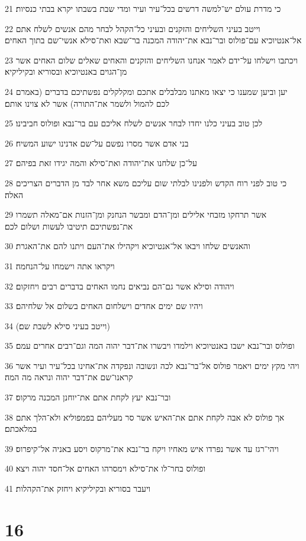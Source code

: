 \par 21 כי מדרת עולם יש־למשה דרשים בכל־עיר ועיר ומדי שבת בשבתו יקרא בבתי כנסיות׃
\par 22 וייטב בעיני השליחים והזקנים ובעיני כל־הקהל לבחר מהם אנשים לשלח אתם אל־אנטיוכיא עם־פולוס ובר־נבא את־יהודה המכנה בר־שבא ואת־סילא אנשי־שם בתוך האחים׃
\par 23 ויכתבו וישלחו על־ידם לאמר אנחנו השליחים והזקנים והאחים שאלים שלום האחים אשר מן־הגוים באנטיוכיא ובסוריא ובקיליקיא׃
\par 24 יען וביען שמענו כי יצאו מאתנו מבלבלים אתכם ומקלקלים נפשתיכם בדברים (באמרם לכם להמול ולשמר את־התורה) אשר לא צוינו אותם׃
\par 25 לכן טוב בעיני כלנו יחדו לבחר אנשים לשלח אליכם עם בר־נבא ופולוס חביבינו׃
\par 26 בני אדם אשר מסרו נפשם על־שם אדנינו ישוע המשיח׃
\par 27 על־כן שלחנו את־יהודה ואת־סילא והמה יגידו זאת בפיהם׃
\par 28 כי טוב לפני רוח הקדש ולפנינו לבלתי שום עליכם משא אחר לבד מן הדברים הצריכים האלה׃
\par 29 אשר תרחקו מזבחי אלילים ומן־הדם ומבשר הנחנק ומן־הזנות אם־מאלה תשמרו את־נפשתיכם תיטיבו לעשות ושלום לכם׃
\par 30 והאנשים שלחו ויבאו אל־אנטיוכיא ויקהילו את־העם ויתנו להם את־האגרת׃
\par 31 ויקראו אתה וישמחו על־הנחמה׃
\par 32 ויהודה וסילא אשר גם־הם נביאים נחמו האחים בדברים רבים ויחזקום׃
\par 33 ויהיו שם ימים אחדים וישלחום האחים בשלום אל שלחיהם׃
\par 34 (וייטב בעיני סילא לשבת שם׃)
\par 35 ופולוס ובר־נבא ישבו באנטיוכיא וילמדו ויבשרו את־דבר יהוה המה וגם־רבים אחרים עמם׃
\par 36 ויהי מקץ ימים ויאמר פולוס אל־בר־נבא לכה ונשובה ונפקדה את־אחינו בכל־עיר ועיר אשר קראנו־שם את־דבר יהוה ונראה מה המה׃
\par 37 ובר־נבא יעץ לקחת אתם את־יוחנן המכנה מרקוס׃
\par 38 אך פולוס לא אבה לקחת אתם את־האיש אשר סר מעליהם בפמפוליא ולא־הלך אתם במלאכתם׃
\par 39 ויהי־רגז עד אשר נפרדו איש מאחיו ויקח בר־נבא את־מרקוס ויסע באניה אל־קיפרוס׃
\par 40 ופולוס בחר־לו את־סילא וימסרהו האחים אל־חסד יהוה ויצא׃
\par 41 ויעבר בסוריא ובקיליקיא ויחזק את־הקהלות׃

\chapter{16}

